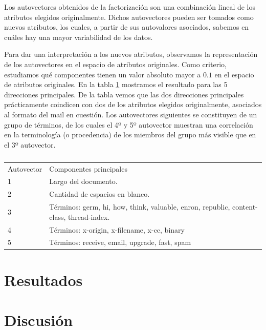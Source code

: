 \documentclass[a4paper,10pt]{article}
\begin{document}
\par Los autovectores obtenidos de la factorización son una combinación lineal de los atributos elegidos originalmente. Dichos autovectores pueden ser tomados como nuevos atributos, los cuales, a partir de sus autovalores asociados, sabemos en cuáles hay una mayor variabilidad de los datos. 
\par Para dar una interpretación a los nuevos atributos, observamos la representación de los autovectores en el espacio de atributos originales. Como criterio, estudiamos qué componentes tienen un valor absoluto mayor a $0.1$ en el espacio de atributos originales. En la tabla \ref{table:autovectores} mostramos el resultado para las 5 direcciones principales. De la tabla vemos que las dos direcciones principales prácticamente coindicen con dos de los atributos elegidos originalmente, asociados al formato del mail en cuestión. Los autovectores siguientes se constituyen de un grupo de términos, de los cuales el 4º y 5º autovector muestran una correlación en la terminología (o procedencia) de los miembros del grupo más visible que en el 3º autovector. 
\begin{table}
\centering
\caption{}
\label{table:autovectores}
\begin{tabular}{ll}
Autovector & Componentes principales \\
1 & Largo del documento. \\
2 & Cantidad de espacios en blanco. \\
3 & Términos: germ, hi, how, think, valuable, enron, republic, content-class, thread-index. \\
4 & Términos: x-origin, x-filename, x-cc, binary \\
5 & Términos: receive, email, upgrade, fast, spam \\
\end{tabular}
\end{table}


\section{Resultados}

\section{Discusi\'on}


\scriptsize


\end{document}
